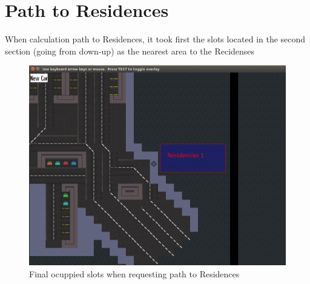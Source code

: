 \section{Path to Residences}
When calculation path to Residences, it took first the slots located in the second section (going from down-up) as the nearest 
area to the Recidenses
\begin{figure}[H]
    \centering
    \includegraphics[width=.6\textwidth]{images/path_to_residences.png}
    \caption{Final ocuppied slots when requesting path to Residences}
    \label{fig:path_to_residences}
\end{figure}
